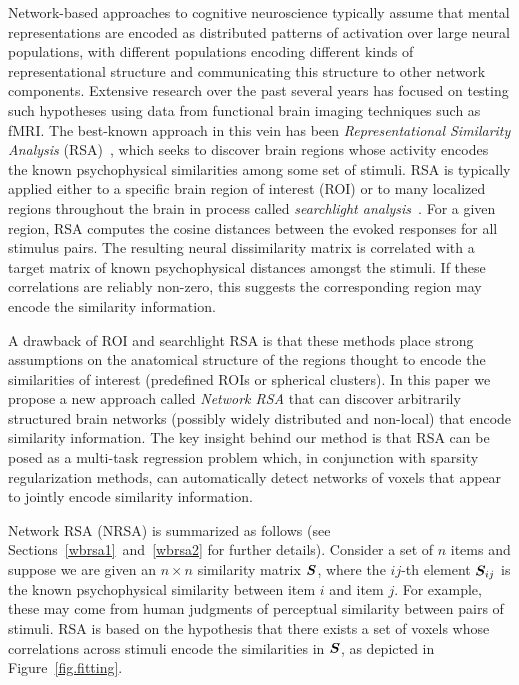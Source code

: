 Network-based approaches to cognitive neuroscience typically assume that mental
representations are encoded as distributed patterns of activation over large neural
populations, with different populations encoding different kinds of representational
structure and communicating this structure to other network components. Extensive research
over the past several years has focused on testing such hypotheses using data from
functional brain imaging techniques such as fMRI. The best-known approach in this vein has
been \emph{Representational Similarity Analysis} (RSA)~\cite{RSA}, which seeks to discover
brain regions whose activity encodes the known psychophysical similarities among some set
of stimuli. RSA is typically applied either to a specific brain region of interest (ROI)
or to many localized regions throughout the brain in process called {\em searchlight
analysis}~\cite{searchlight}. For a given region, RSA computes the cosine distances
between the evoked responses for all stimulus pairs. The resulting neural dissimilarity
matrix is correlated with a target matrix of known psychophysical distances amongst the
stimuli. If these correlations are reliably non-zero, this suggests the corresponding
region may encode the similarity information.

A drawback of ROI and searchlight RSA is that these methods place strong assumptions on
the anatomical structure of the regions thought to encode the similarities of interest
(predefined ROIs or spherical clusters). In this paper we propose a new approach called
{\em Network RSA} that can discover arbitrarily structured brain networks (possibly widely
distributed and non-local) that encode similarity information. The key insight behind our
method is that RSA can be posed as a multi-task regression problem which, in conjunction
with sparsity regularization methods, can automatically detect networks of voxels that
appear to jointly encode similarity information.

Network RSA (NRSA) is summarized as follows (see Sections~\ref{wbrsa1}~and~\ref{wbrsa2}
for further details). Consider a set of $n$ items and suppose we are given an $n \times
n$ similarity matrix $\boldsymbol{S}$, where the $ij$-th element $\boldsymbol{S}_{ij}$ is the known
psychophysical similarity \cite{similarity} between item $i$ and item $j$. For example,
these may come from human judgments of perceptual similarity between pairs of stimuli.
RSA is based on the hypothesis that there exists a set of voxels whose correlations across
stimuli encode the similarities in $\boldsymbol{S}$, as depicted in Figure~\ref{fig.fitting}.

